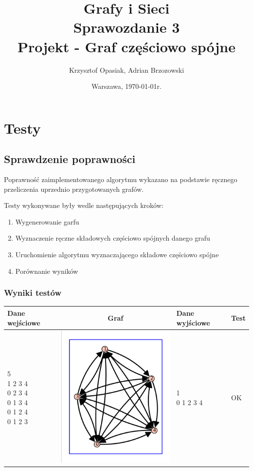 \documentclass[a4paper,10pt]{article}
\title{{\textbf{Grafy i Sieci}}\\[1ex]
       {\Large Sprawozdanie 3}\\[-1ex]
       {\Large Projekt - Graf częściowo spójne}}
\author{Krzysztof Opasiak, Adrian Brzozowski}
\date{Warszawa, \today r.}
\begin{document}
\maketitle

\section{Testy}
\subsection{Sprawdzenie poprawności}

Poprawność zaimplementowanego algorytmu wykazano na podstawie ręcznego przeliczenia uprzednio przygotowanych grafów.

Testy wykonywane były wedle następujących kroków:
\begin{enumerate}
\item Wygenerowanie garfu
\item Wyznaczenie ręczne składowych częściowo spójnych danego grafu
\item Uruchomienie algorytmu wyznaczającego składowe częściowo spójne
\item Porównanie wyników
\end{enumerate}

\subsubsection{Wyniki testów}

\begin{center}
\begin{tabular}{|l|c|l|l|}\hline
{\bf Dane wejściowe}&{\bf Graf}&{\bf Dane wyjściowe}&{\bf Test}\\ \hline
\shortstack[l]{
5\\
1 2 3 4\\
0 2 3 4\\
0 1 3 4\\
0 1 2 4\\
0 1 2 3
}
&\includegraphics[width=5 cm]{sample_data}&
\shortstack[l]{
1\\
0 1 2 3 4 
}
&OK\\ \hline
\end{tabular}
\end{center}
\end{document}
